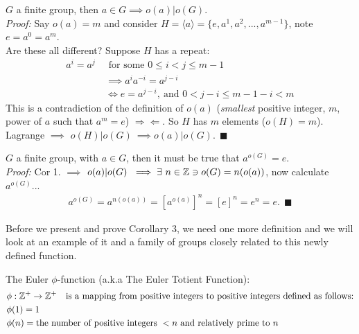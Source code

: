 \setcounter{dummy_lemma}{0}
\begin{corollary}
$G$ a finite group, then $a\in G \implies o(a)|o(G)$.\\
\textit{Proof:} Say $o(a)=m$ and consider $H=\langle a \rangle =\{e,a^1,a^2,...,a^{m-1}\}$, note $e=a^0=a^m$.\steezybreak\\
Are these all different? Suppose $H$ has a repeat:
\begin{align}
    a^i=a^j \ &\text{ for some } 0\leq i < j \leq m-1 \nonumber \\
    &\implies a^ia^{-i}=a^{j-i} \nonumber \\
    &\iff e=a^{j-i}, \ \text{and } 0<j-i\leq m-1-i < m \nonumber
\end{align}
This is a contradiction of the definition of $o(a)$ (\textit{smallest} positive integer, $m$, power of $a$ such that $a^m=e$) $\Rightarrow \Leftarrow$. So $H$ has $m$ elements ($o(H)=m$).\\
Lagrange $\implies$ $o(H)|o(G) \ \implies o(a)|o(G). \ \  \blacksquare$
\end{corollary}

\setcounter{dummy_lemma}{0}
\begin{corollary}
$G$ a finite group, with $a\in G$, then it must be true that $a^{o(G)}=e$.\\
\textit{Proof:} Cor 1. $\implies$ $o(a)|o(G) \ \implies \exists \ n\in {\mathbb{ Z}} \ni o(G)=n(o(a))$, now calculate $a^{o(G)}$...
\begin{align}
    a^{o(G)}=a^{n(o(a))}=[a^{o(a)}]^n=[e]^n=e^n=e. \ \ \blacksquare \nonumber
\end{align}
\end{corollary}
Before we present and prove Corollary 3, we need one more definition and we will look at an example of it and a family of groups closely related to this newly defined function.
\begin{definition}
The Euler $\phi$-function (a.k.a The Euler Totient Function):\\
\begin{align}
    &\phi : {\mathbb{ Z}}^+\rightarrow {\mathbb{ Z}}^+ \ \ \text{ is a mapping from positive integers to positive integers defined as follows:}\nonumber \\
    &\phi(1)=1 \nonumber \\
    &\phi(n)=\text{the number of positive integers }<n\text{ and relatively prime to }n \nonumber
\end{align}
\end{definition}

